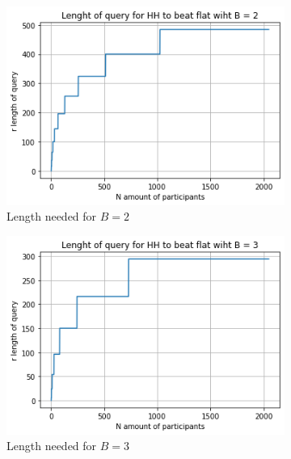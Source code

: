 \documentclass[11pt]{article}
\theoremstyle{definition}
\begin{document}
\begin{figure}[H]
     \centering
     \begin{subfigure}[b]{0.3\textwidth}
         \centering
         \includegraphics[width=\textwidth]{figures/benefit_2.png}
         \caption{Length needed for $B=2$}
         \label{fig:y equals x}
     \end{subfigure}
     \hfill
     \begin{subfigure}[b]{0.3\textwidth}
         \centering
         \includegraphics[width=\textwidth]{figures/benefit_3.png}
         \caption{Length needed for $B=3$}
         \label{fig:three sin x}
     \end{subfigure}
     \hfill
     \begin{subfigure}[b]{0.3\textwidth}
         \centering

\end{subfigure}
\end{figure}
\end{document}
